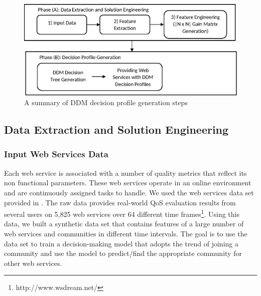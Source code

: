 \begin{figure}%
\centerline{\includegraphics[width=5.25in]{figures/steps.eps}}
\caption{A summary of DDM decision profile generation steps}
\label{fig_steps}
\end{figure}

\subsection{Data Extraction and Solution Engineering}\label{ss:learningdata}

\subsubsection{Input Web Services Data}\label{sss:webservices}

Each web service is associated with a number of quality metrics that reflect its non functional parameters. These web services operate in an online environment and are continuously assigned tasks to handle. %
We used the web services data set provided in \cite{10.1109/ISSRE.2011.17}. The raw data provides real-world QoS evaluation results from several users on 5,825 web services over 64 different time frames\footnote{http://www.wsdream.net/}. %
Using this data, we built a synthetic data set that contains features of a large number of web services and communities in different time intervals. The goal is to use the data set to train a decision-making model that adopts the trend of joining a community and use the model to predict/find the appropriate community for other web services. %

